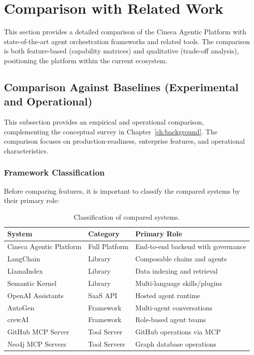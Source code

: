 
\section{Comparison with Related Work}
\label{sec:comparison}

This section provides a detailed comparison of the Cineca Agentic Platform with state-of-the-art agent orchestration frameworks and related tools. The comparison is both feature-based (capability matrices) and qualitative (trade-off analysis), positioning the platform within the current ecosystem.

\subsection{Comparison Against Baselines (Experimental and Operational)}
\label{subsec:comparison-baselines}

This subsection provides an empirical and operational comparison, complementing the conceptual survey in Chapter~\ref{ch:background}. The comparison focuses on production-readiness, enterprise features, and operational characteristics.

\subsubsection{Framework Classification}

Before comparing features, it is important to classify the compared systems by their primary role:

\begin{table}[ht]
\centering
\caption{Classification of compared systems.}
\label{tab:system-classification}
\small
\begin{tabular}{llp{6cm}}
\hline
\textbf{System} & \textbf{Category} & \textbf{Primary Role} \\
\hline
Cineca Agentic Platform & Full Platform & End-to-end backend with governance \\
LangChain & Library & Composable chains and agents \\
LlamaIndex & Library & Data indexing and retrieval \\
Semantic Kernel & Library & Multi-language skills/plugins \\
OpenAI Assistants & SaaS API & Hosted agent runtime \\
AutoGen & Framework & Multi-agent conversations \\
crewAI & Framework & Role-based agent teams \\
GitHub MCP Server & Tool Server & GitHub operations via MCP \\
Neo4j MCP Servers & Tool Servers & Graph database operations \\
\hline
\end{tabular}
\end{table}

